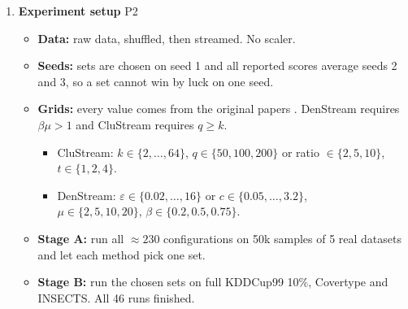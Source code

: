 \begin{enumerate}[label=\textbf{C\arabic*.},leftmargin=2.2em]
  \item \textbf{Experiment setup} \hfill{\small P2}
  \begin{itemize}[leftmargin=1.2em,itemsep=2pt,topsep=1pt]
    \item \textbf{Data:} raw data, shuffled, then streamed. No scaler.
    \item \textbf{Seeds:} sets are chosen on seed 1 and all reported scores average seeds 2 and 3, so a set cannot win by luck on one seed.
    \item \textbf{Grids:} every value comes from the original papers \cite{aggarwal2003clustream,cao2006denstream}. DenStream requires $\beta\mu > 1$ and CluStream requires $q \ge k$.
    \begin{itemize}[leftmargin=1.2em,itemsep=1pt]
      \item CluStream: $k \in \{2,\dots,64\}$, $q \in \{50,100,200\}$ or ratio $\in \{2,5,10\}$, $t \in \{1,2,4\}$.
      \item DenStream: $\varepsilon \in \{0.02,\dots,16\}$ or $c \in \{0.05,\dots,3.2\}$,\\ $\mu \in \{2,5,10,20\}$, $\beta \in \{0.2,0.5,0.75\}$.
    \end{itemize}
    \item \textbf{Stage A:} run all $\approx 230$ configurations on 50k samples of 5 real datasets and let each method pick one set.
    \item \textbf{Stage B:} run the chosen sets on full KDDCup99 10\%, Covertype and INSECTS. All 46 runs finished.
  \end{itemize}
\end{enumerate}
\normalsize\par
